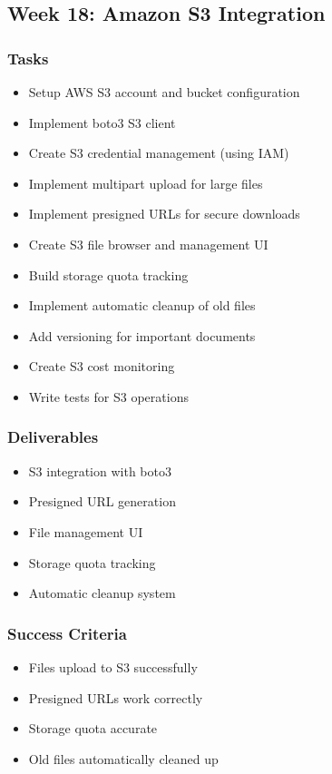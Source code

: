 \documentclass[12pt,oneside]{report}
\begin{document}
\subsection{Week 18: Amazon S3 Integration}

\subsubsection{Tasks}

\begin{itemize}
    \item Setup AWS S3 account and bucket configuration
    \item Implement boto3 S3 client
    \item Create S3 credential management (using IAM)
    \item Implement multipart upload for large files
    \item Implement presigned URLs for secure downloads
    \item Create S3 file browser and management UI
    \item Build storage quota tracking
    \item Implement automatic cleanup of old files
    \item Add versioning for important documents
    \item Create S3 cost monitoring
    \item Write tests for S3 operations
\end{itemize}

\subsubsection{Deliverables}

\begin{itemize}
    \item S3 integration with boto3
    \item Presigned URL generation
    \item File management UI
    \item Storage quota tracking
    \item Automatic cleanup system
\end{itemize}

\subsubsection{Success Criteria}

\begin{itemize}
    \item Files upload to S3 successfully
    \item Presigned URLs work correctly
    \item Storage quota accurate
    \item Old files automatically cleaned up
\end{itemize}
\end{document}
